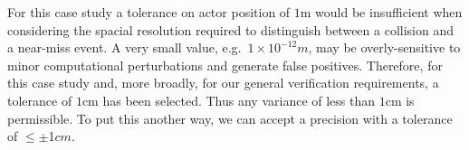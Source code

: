 \documentclass[runningheads,twocolumn,a4paper,10pt]{llncs}
\begin{document}
%
% 

%
For this case study a tolerance on actor position of $1$m would be insufficient when considering the spacial resolution required to distinguish between a collision and a near-miss event. 
A very small value, e.g.\ $1\times10^{-12}m$, may be overly-sensitive to minor computational perturbations and generate false positives. 
Therefore, for this case study and, more broadly, for our general verification requirements, a tolerance of $1$cm has been selected. 
Thus any variance of less than $1$cm is permissible. To put this another way, we can accept a precision with a tolerance of $\leq$$\pm$1$cm$. 


%


\end{document}
